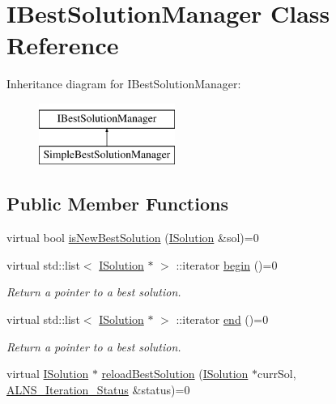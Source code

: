 \hypertarget{classIBestSolutionManager}{\section{\-I\-Best\-Solution\-Manager \-Class \-Reference}
\label{classIBestSolutionManager}
}
\-Inheritance diagram for \-I\-Best\-Solution\-Manager\-:\begin{figure}[H]
\begin{center}
\leavevmode
\includegraphics[height=2.000000cm]{classIBestSolutionManager}
\end{center}
\end{figure}
\subsection*{\-Public \-Member \-Functions}
\begin{DoxyCompactItemize}
\item 
virtual bool \hyperlink{classIBestSolutionManager_adf056afba7bfda2b3a3260d8118d5c44}{is\-New\-Best\-Solution} (\hyperlink{classISolution}{\-I\-Solution} \&sol)=0
\item 
\hypertarget{classIBestSolutionManager_ab4f9c16464364b2a3b9b45a0453a32d1}{virtual std\-::list$<$ \hyperlink{classISolution}{\-I\-Solution} $\ast$ $>$\*
\-::iterator \hyperlink{classIBestSolutionManager_ab4f9c16464364b2a3b9b45a0453a32d1}{begin} ()=0}\label{classIBestSolutionManager_ab4f9c16464364b2a3b9b45a0453a32d1}

\begin{DoxyCompactList}\small\item\em \-Return a pointer to a best solution. \end{DoxyCompactList}\item 
\hypertarget{classIBestSolutionManager_ade090d69dfaa3bb36f2b5b21bf652c8f}{virtual std\-::list$<$ \hyperlink{classISolution}{\-I\-Solution} $\ast$ $>$\*
\-::iterator \hyperlink{classIBestSolutionManager_ade090d69dfaa3bb36f2b5b21bf652c8f}{end} ()=0}\label{classIBestSolutionManager_ade090d69dfaa3bb36f2b5b21bf652c8f}

\begin{DoxyCompactList}\small\item\em \-Return a pointer to a best solution. \end{DoxyCompactList}\item 
virtual \hyperlink{classISolution}{\-I\-Solution} $\ast$ \hyperlink{classIBestSolutionManager_a592e8c6de9b295e834ef04f52ae376a6}{reload\-Best\-Solution} (\hyperlink{classISolution}{\-I\-Solution} $\ast$curr\-Sol, \hyperlink{classALNS__Iteration__Status}{\-A\-L\-N\-S\-\_\-\-Iteration\-\_\-\-Status} \&status)=0
\end{DoxyCompactItemize}


